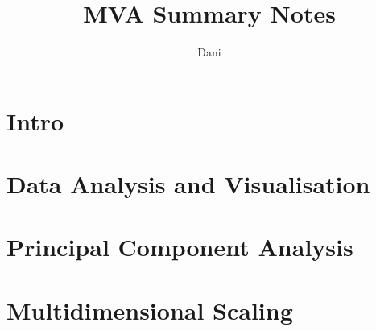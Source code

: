 \documentclass{report}
\title{MVA Summary Notes}
\author{Dani}
\date{}
\begin{document}
    \maketitle
    \tableofcontents

    \chapter{Intro}
    

    \newpage
    \chapter{Data Analysis and Visualisation}
    

    \newpage
    \chapter{Principal Component Analysis}
    

    \newpage
    \chapter{Multidimensional Scaling}
    
\end{document}
